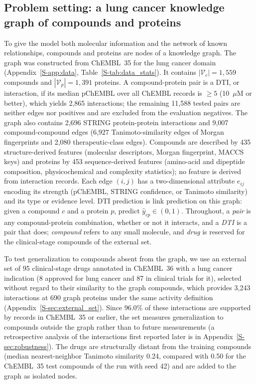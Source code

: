 \documentclass[10pt,letterpaper]{article}
\begin{document}
\subsection{Problem setting: a lung cancer knowledge graph of compounds and proteins}
\label{sec:graph}
To give the model both molecular information and the network of known relationships, compounds and proteins are nodes of a knowledge graph. The graph was constructed from ChEMBL~35 \cite{zdrazil2024chembl} for the lung cancer domain (Appendix~\ref{S-app:data}, Table~\ref{S-tab:data_stats}). It contains $|\mathcal{V}_c|=1{,}559$ compounds and $|\mathcal{V}_p|=1{,}391$ proteins. A compound-protein pair is a DTI, or interaction, if its median pChEMBL over all ChEMBL records is $\geq 5$ (10~$\mu$M or better), which yields 2,865 interactions; the remaining 11,588 tested pairs are neither edges nor positives and are excluded from the evaluation negatives. The graph also contains 2,696 STRING protein-protein interactions \cite{szklarczyk2023string} and 9,007 compound-compound edges (6,927 Tanimoto-similarity edges of Morgan fingerprints and 2,080 therapeutic-class edges). Compounds are described by 435 structure-derived features (molecular descriptors, Morgan fingerprint, MACCS keys) and proteins by 453 sequence-derived features (amino-acid and dipeptide composition, physicochemical and complexity statistics); no feature is derived from interaction records. Each edge $(i,j)$ has a two-dimensional attribute $e_{ij}$ encoding its strength (pChEMBL, STRING confidence, or Tanimoto similarity) and its type or evidence level. DTI prediction is link prediction on this graph: given a compound $c$ and a protein $p$, predict $\hat{y}_{cp}\in(0,1)$. Throughout, a \emph{pair} is any compound-protein combination, whether or not it interacts, and a \emph{DTI} is a pair that does; \emph{compound} refers to any small molecule, and \emph{drug} is reserved for the clinical-stage compounds of the external set.

To test generalization to compounds absent from the graph, we use an external set of 95 clinical-stage drugs annotated in ChEMBL~36 with a lung cancer indication (8 approved for lung cancer and 87 in clinical trials for it), selected without regard to their similarity to the graph compounds, which provides 3,243 interactions at 690 graph proteins under the same activity definition (Appendix~\ref{S-sec:external_set}). Since 96.0\% of these interactions are supported by records in ChEMBL~35 or earlier, the set measures generalization to compounds outside the graph rather than to future measurements (a retrospective analysis of the interactions first reported later is in Appendix~\ref{S-sec:robustness}). The drugs are structurally distant from the training compounds (median nearest-neighbor Tanimoto similarity 0.24, compared with 0.50 for the ChEMBL~35 test compounds of the run with seed 42) and are added to the graph as isolated nodes.
\end{document}
